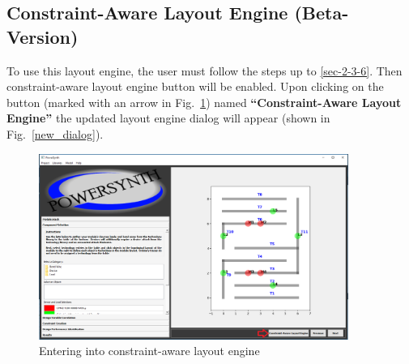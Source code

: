 \documentclass[11pt]{article}
\begin{document}
\pagebreak

\subsection{Constraint-Aware Layout Engine (Beta-Version)}
\label{sec-2-6}
To use this layout engine, the user must follow the steps up to \ref{sec-2-3-6}. Then constraint-aware layout engine button will be enabled. Upon clicking on the button (marked with an arrow in Fig.~\ref{start_w}) named \textbf{“Constraint-Aware Layout Engine”} the updated layout engine dialog will appear (shown in Fig.~\ref{new_dialog}).
\begin{figure}[h]
\centering

\includegraphics[width=0.9\textwidth]{./figs/start.PNG}
\caption{Entering into constraint-aware layout engine}
\label{start_w}
\end{figure}
\end{document}
